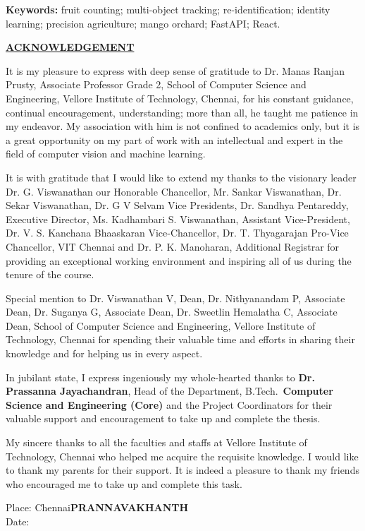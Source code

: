 \documentclass[12pt,a4paper]{report}
\newcommand{\add}[1]{#1}
\newcommand{\fronthead}[1]{%
  \begin{center}\underline{\textbf{\fontsize{14}{17}\selectfont #1}}\end{center}\vspace{6pt}}
\newcommand{\candtwoname}{PRANNAVAKHANTH}
\newcommand{\guidename}{Dr. Manas Ranjan Prusty}
\newcommand{\guidedesig}{Associate Professor Grade 2}
\newcommand{\hodname}{Dr. Prassanna Jayachandran}
\newcommand{\specname}{Core}
\begin{document}
\vspace{6pt}
\noindent\textbf{Keywords:} \add{fruit counting; multi-object tracking; re-identification; identity learning; precision agriculture; mango orchard; FastAPI; React.}

\clearpage
\fronthead{ACKNOWLEDGEMENT}
It is my pleasure to express with deep sense of gratitude to \guidename, \guidedesig, School of Computer Science and Engineering, Vellore Institute of Technology, Chennai, for his constant guidance, continual encouragement, understanding; more than all, he taught me patience in my endeavor. My association with him is not confined to academics only, but it is a great opportunity on my part of work with an intellectual and expert in the field of \add{computer vision and machine learning}.

It is with gratitude that I would like to extend my thanks to the visionary leader Dr. G. Viswanathan our Honorable Chancellor, Mr. Sankar Viswanathan, Dr. Sekar Viswanathan, Dr. G V Selvam Vice Presidents, Dr. Sandhya Pentareddy, Executive Director, Ms. Kadhambari S. Viswanathan, Assistant Vice-President, Dr. V. S. Kanchana Bhaaskaran Vice-Chancellor, Dr. T. Thyagarajan Pro-Vice Chancellor, VIT Chennai and Dr. P. K. Manoharan, Additional Registrar for providing an exceptional working environment and inspiring all of us during the tenure of the course.

Special mention to Dr. Viswanathan V, Dean, Dr. Nithyanandam P, Associate Dean, Dr. Suganya G, Associate Dean, Dr. Sweetlin Hemalatha C, Associate Dean, School of Computer Science and Engineering, Vellore Institute of Technology, Chennai for spending their valuable time and efforts in sharing their knowledge and for helping us in every aspect.

In jubilant state, I express ingeniously my whole-hearted thanks to \textbf{\hodname}, Head of the Department, B.Tech.\ \textbf{Computer Science and Engineering (\specname)} and the Project Coordinators for their valuable support and encouragement to take up and complete the thesis.

My sincere thanks to all the faculties and staffs at Vellore Institute of Technology, Chennai who helped me acquire the requisite knowledge. I would like to thank my parents for their support. It is indeed a pleasure to thank my friends who encouraged me to take up and complete this task.

\vspace{18pt}
\noindent Place: Chennai\hfill\textbf{\candtwoname}\\
Date:
\end{document}
